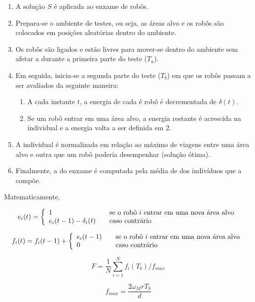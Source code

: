 \begin{enumerate}
    \item A solução $S$ é aplicada ao enxame de robôs.
    \item Prepara-se o ambiente de testes, ou seja, as áreas alvo e os robôs são colocados em posições aleatórias dentro do ambiente.
    \item Os robôs são ligados e estão livres para mover-se dentro do ambiente sem afetar a \fitness durante a primeira parte do teste ($T_{a}$).
    \item Em seguida, inicia-se a segunda parte do teste ($T_{b}$) em que os robôs passam a ser avaliados da seguinte maneira:
    \begin{enumerate}
        \item A cada instante $t$, a energia de cada é robô é decrementada de $\delta (t)$.
        \item Se um robô entrar em uma área alvo, a energia restante é acrescida na \fitness individual e a energia volta a ser definida em 2.
    \end{enumerate}
    \item A \fitness individual é normalizada em relação ao máximo de viagens entre uma área alvo e outra que um robô poderia desempenhar (solução ótima).
    \item Finalmente, a \fitness do enxame é computada pela média de \fitness dos indivíduos que a compõe.
\end{enumerate}

Matematicamente,

$$
e_{i} (t) = \left\{
\begin{array}{l l}
1 & \quad \text{se o robô $i$ entrar em uma nova área alvo}\\
e_{i}(t - 1) - \delta_{i} (t) & \quad \text{caso contrário}
\end{array} \right.
$$

$$
f_{i} (t) = f_{i} (t - 1) + \left\{
\begin{array}{l l}
e_{i}(t - 1) & \quad \text{se o robô $i$ entrar em uma nova área alvo}\\
0 & \quad \text{caso contrário}
\end{array} \right.
$$

\noindent\begin{minipage}{.5\linewidth}
$$
F = \frac{1}{N} \sum_{i=1}^{N} f_{i} (T_{b}) / f_{max}
$$
\end{minipage}%
\begin{minipage}{.5\linewidth}
$$
f_{max} = \frac{2 \omega_{M} r T_{b}}{d}
$$
\end{minipage}\\


